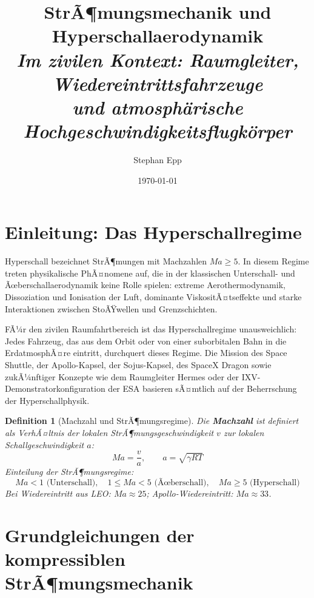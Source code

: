﻿\documentclass[12pt,a4paper]{article}
\title{StrÃ¶mungsmechanik und Hyperschallaerodynamik\\[0.4em]
  \large\textit{Im zivilen Kontext: Raumgleiter, Wiedereintrittsfahrzeuge\\
und atmosph\"{a}rische Hochgeschwindigkeitsflugk\"{o}rper}}
\author{Stephan Epp}
\date{\today}
\newtheorem{definition}{Definition}[section]
\newcommand{\Ma}{M\!a}
\begin{document}

\maketitle

\tableofcontents
\newpage

\section{Einleitung: Das Hyperschallregime}

Hyperschall bezeichnet StrÃ¶mungen mit Machzahlen $\Ma \geq 5$. In diesem Regime
treten physikalische PhÃ¤nomene auf, die in der klassischen Unterschall- und
Ãœberschallaerodynamik keine Rolle spielen: extreme Aerothermodynamik,
Dissoziation und Ionisation der Luft, dominante ViskositÃ¤tseffekte und starke
Interaktionen zwischen StoÃŸwellen und Grenzschichten.

FÃ¼r den zivilen Raumfahrtbereich ist das Hyperschallregime unausweichlich: Jedes
Fahrzeug, das aus dem Orbit oder von einer suborbitalen Bahn in die ErdatmosphÃ¤re
eintritt, durchquert dieses Regime. Die Mission des Space Shuttle, der Apollo-Kapsel,
der Sojus-Kapsel, des SpaceX Dragon sowie zukÃ¼nftiger Konzepte wie dem Raumgleiter
Hermes oder der IXV-Demonstratorkonfiguration der ESA basieren sÃ¤mtlich auf der
Beherrschung der Hyperschallphysik.

\begin{definition}[Machzahl und StrÃ¶mungsregime]
Die \textbf{Machzahl} ist definiert als VerhÃ¤ltnis der lokalen StrÃ¶mungsgeschwindigkeit
$v$ zur lokalen Schallgeschwindigkeit $a$:
\[
  \Ma = \frac{v}{a}, \qquad a = \sqrt{\gamma R T}
\]
Einteilung der StrÃ¶mungsregime:
\[
  \Ma < 1 \text{ (Unterschall)},\quad
  1 \leq \Ma < 5 \text{ (Ãœberschall)},\quad
  \Ma \geq 5 \text{ (Hyperschall)}
\]
Bei Wiedereintritt aus LEO: $\Ma \approx 25$; Apollo-Wiedereintritt: $\Ma \approx 33$.
\end{definition}

\section{Grundgleichungen der kompressiblen StrÃ¶mungsmechanik}
\end{document}
